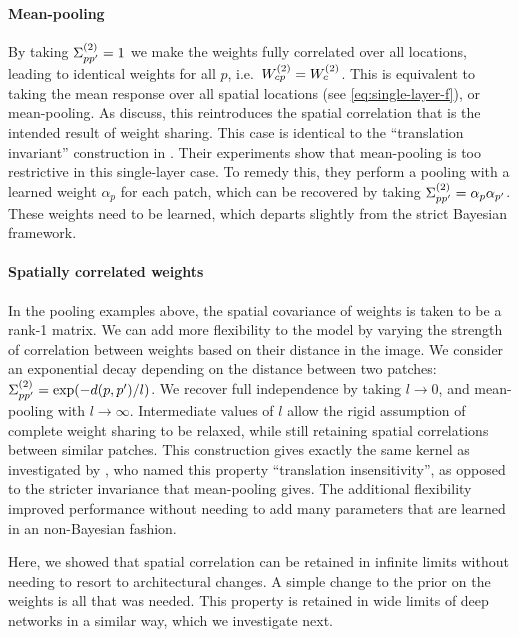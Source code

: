 \documentclass{article}
\theoremstyle{definition}
\begin{document}
\paragraph{Mean-pooling} By taking $\Sigma^{(2)}_{pp'} = 1$ we make the weights fully correlated over all locations, leading to identical weights for all $p$, i.e.~$W^{(2)}_{cp} = W^{(2)}_{c}$. This is equivalent to taking the mean response over all spatial locations (see \cref{eq:single-layer-f}), or mean-pooling. As \citet{novak2019infiniteconv} discuss, this reintroduces the spatial correlation that is the intended result of weight sharing. This case is identical to the ``translation invariant'' construction in . Their experiments show that mean-pooling is too restrictive in this single-layer case. To remedy this, they perform a pooling with a learned weight ${\alpha_p}$ for each patch, which can be recovered by taking $\Sigma^{(2)}_{pp'} = \alpha_p \alpha_{p'}$. These weights need to be learned, which departs slightly from the strict Bayesian framework.

\paragraph{Spatially correlated weights} In the pooling examples above, the spatial covariance of weights is taken to be a rank-1 matrix. We can add more flexibility to the model by varying the strength of correlation between weights based on their distance in the image. We consider an exponential decay depending on the distance between two patches: $\Sigma^{(2)}_{pp'} = \exp(-d(p, p')/l)$. We recover full independence by taking $l\to 0$, and mean-pooling with $l\to\infty$. Intermediate values of $l$ allow the rigid assumption of complete weight sharing to be relaxed, while still retaining spatial correlations between similar patches. This construction gives exactly the same kernel as investigated by \citet{dutordoir2020}, who named this property ``translation insensitivity'', as opposed to the stricter invariance that mean-pooling gives. The additional flexibility improved performance without needing to add many parameters that are learned in an non-Bayesian fashion.

Here, we showed that spatial correlation can be retained in infinite limits without needing to resort to architectural changes. A simple change to the prior on the weights is all that was needed. This property is retained in wide limits of deep networks in a similar way, which we investigate next.
\end{document}

